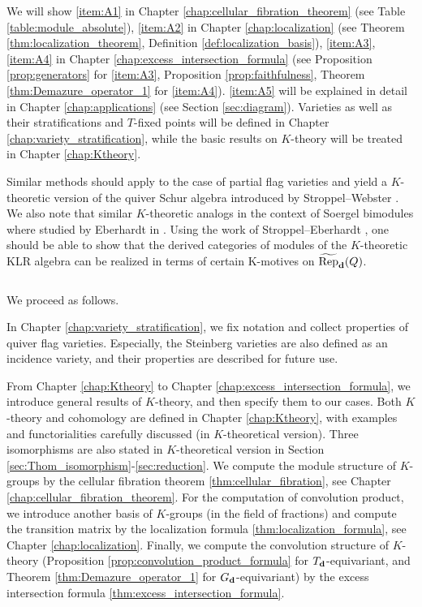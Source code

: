 We will show \eqref{item:A1} in Chapter \ref{chap:cellular_fibration_theorem} (see Table \ref{table:module_absolute}), \eqref{item:A2} in Chapter \ref{chap:localization} (see Theorem \ref{thm:localization_theorem}, Definition \ref{def:localization_basis}), \eqref{item:A3}, \eqref{item:A4} in Chapter \ref{chap:excess_intersection_formula} (see Proposition \ref{prop:generators} for \eqref{item:A3}, Proposition \ref{prop:faithfulness}, Theorem \ref{thm:Demazure_operator_1} for \eqref{item:A4}). \eqref{item:A5} will be explained in detail in Chapter \ref{chap:applications} (see Section \ref{sec:diagram}). Varieties as well as their stratifications and $T$-fixed points will be defined in Chapter \ref{chap:variety_stratification}, while the basic results on $K$-theory will be treated in Chapter \ref{chap:Ktheory}.

Similar methods should apply to the case of partial flag varieties and yield a $K$-theoretic version of the quiver Schur algebra introduced by Stroppel--Webster \cite{https://doi.org/10.48550/arxiv.1110.1115}. We also note that similar $K$-theoretic analogs in the context of Soergel bimodules where studied by Eberhardt in  \cite{Eberhardt2022Koszul,https://doi.org/10.48550/arxiv.2208.01665}. Using the work of Stroppel--Eberhardt \cite{https://doi.org/10.48550/arxiv.1110.1115}, one should be able to show that the derived categories of modules of the $K$-theoretic KLR algebra can be realized in terms of certain K-motives on $\operatorname{\widetilde{\operatorname{Rep}}}_{\mathbf{d}}(Q)$.

$\,$

We proceed as follows.

In Chapter \ref{chap:variety_stratification}, we fix notation and collect properties of quiver flag varieties. Especially, the Steinberg varieties are also defined as an incidence variety, and their properties are described for future use.

From Chapter \ref{chap:Ktheory} to Chapter \ref{chap:excess_intersection_formula}, we introduce general results of $K$-theory, and then specify them to our cases. Both $K$-theory and cohomology are defined in Chapter \ref{chap:Ktheory}, with examples and functorialities carefully discussed (in $K$-theoretical version). Three isomorphisms are also stated in $K$-theoretical version in Section \ref{sec:Thom_isomorphism}-\ref{sec:reduction}. We compute the module structure of $K$-groups by the cellular fibration theorem \ref{thm:cellular_fibration}, see Chapter \ref{chap:cellular_fibration_theorem}. For the computation of convolution product, we introduce another basis of $K$-groups (in the field of fractions) and compute the transition matrix by the localization formula \ref{thm:localization_formula}, see Chapter \ref{chap:localization}. Finally, we compute the convolution structure of $K$-theory (Proposition \ref{prop:convolution_product_formula} for $T_{\mathbf{d}}$-equivariant, and Theorem \ref{thm:Demazure_operator_1} for $G_{\mathbf{d}}$-equivariant) by the excess intersection formula \ref{thm:excess_intersection_formula}.

